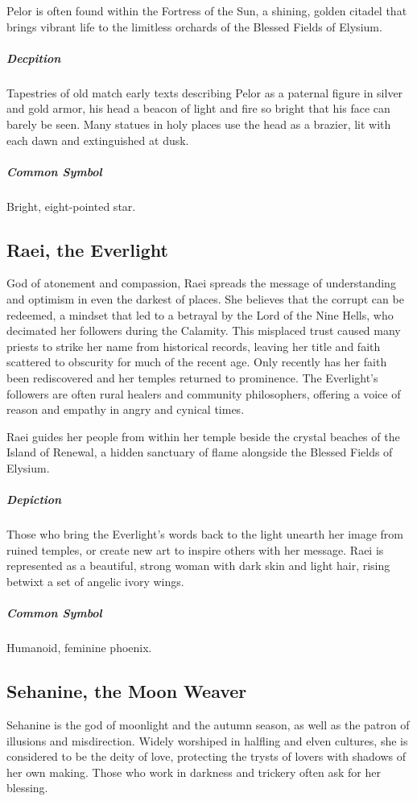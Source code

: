 \documentclass[letterpaper, twocolumn, openany, nodeprecatedcode, layout=true]{dndbook}
\begin{document}
Pelor is often found within the Fortress of the Sun, a shining, golden citadel that brings
vibrant life to the limitless orchards of the Blessed Fields of Elysium.

\subparagraph{Decpition}
Tapestries of old match early texts describing Pelor as a paternal figure in silver and
gold armor, his head a beacon of light and fire so bright that his face can barely be seen.
Many statues in holy places use the head as a brazier, lit with each dawn and extinguished
at dusk.

\subparagraph{Common Symbol}
Bright, eight-pointed star.

\subsection{Raei, the Everlight}

God of atonement and compassion, Raei spreads the message of understanding and optimism in
even the darkest of places. She believes that the corrupt can be redeemed, a mindset that led
to a betrayal by the Lord of the Nine Hells, who decimated her followers during the Calamity.
This misplaced trust caused many priests to strike her name from historical records, leaving
her title and faith scattered to obscurity for much of the recent age. Only recently has her
faith been rediscovered and her temples returned to prominence. The Everlight’s followers are
often rural healers and community philosophers, offering a voice of reason and empathy in
angry and cynical times.

Raei guides her people from within her temple beside the crystal beaches of the Island of
Renewal, a hidden sanctuary of flame alongside the Blessed Fields of Elysium.

\subparagraph{Depiction}
Those who bring the Everlight’s words back to the light unearth her image from ruined temples,
or create new art to inspire others with her message. Raei is represented as a beautiful,
strong woman with dark skin and light hair, rising betwixt a set of angelic ivory wings.

\subparagraph{Common Symbol}
Humanoid, feminine phoenix.

\subsection{Sehanine, the Moon Weaver}

Sehanine is the god of moonlight and the autumn season, as well as the patron of illusions
and misdirection. Widely worshiped in halfling and elven cultures, she is considered to be
the deity of love, protecting the trysts of lovers with shadows of her own making. Those who
work in darkness and trickery often ask for her blessing.
\end{document}
